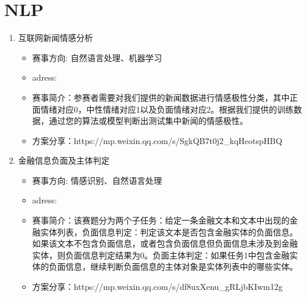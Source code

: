 \documentclass{article}
\begin{document}
	\section{NLP}
		\begin{enumerate}
			\item 互联网新闻情感分析
				\begin{itemize}
					\item 赛事方向: 自然语言处理、机器学习
					\item adress: 
					\item 赛事简介：参赛者需要对我们提供的新闻数据进行情感极性分类，其中正面情绪对应0，中性情绪对应1以及负面情绪对应2。根据我们提供的训练数据，通过您的算法或模型判断出测试集中新闻的情感极性。
					\item 方案分享：https://mp.weixin.qq.com/s/SgkQB7t0j2\_kqHeotspHBQ
				\end{itemize} 
			\item 金融信息负面及主体判定
				\begin{itemize}
					\item 赛事方向: 情感识别、自然语言处理
					\item adress: 
					\item 赛事简介：该赛题分为两个子任务：给定一条金融文本和文本中出现的金融实体列表，负面信息判定：判定该文本是否包含金融实体的负面信息。如果该文本不包含负面信息，或者包含负面信息但负面信息未涉及到金融实体，则负面信息判定结果为0。负面主体判定：如果任务1中包含金融实体的负面信息，继续判断负面信息的主体对象是实体列表中的哪些实体。
					\item 方案分享：https://mp.weixin.qq.com/s/df8uxXenu\_gRLjbKIwm12g
				\end{itemize} 
			
			
			
		\end{enumerate}

	
\end{document}
